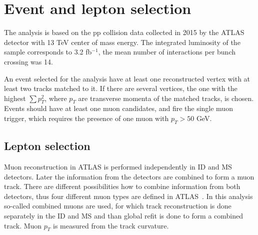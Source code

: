 \section{Event and lepton selection}
\label{sec:wprimeSelection}

The analysis is based on the pp collision data collected in 2015 by the ATLAS detector with 13 TeV center of mass energy.
The integrated luminosity of the sample corresponds to 3.2 fb$^{-1}$, the mean number of interactions per bunch crossing was 14.

An event selected for the analysis have at least one reconstructed vertex with at least two tracks matched to it. 
If there are several vertices, the one with the highest
$\sum p^2_T$, where $p_T$ are transverse momenta of the matched tracks, is chosen.
Events should have at least one muon candidates, and fire the single muon trigger, 
which requires the presence of one muon with $p_T > 50$ GeV.

\subsection{Lepton selection}
Muon reconstruction in ATLAS is performed independently in ID and MS detectors. 
Later the information from the detectors are combined to form a muon track.
There are different possibilities how to combine information from both detectors, 
thus four different muon types are defined in ATLAS~\cite{muon_performance_2015}.
In this analysis so-called combined muons are used, for which track reconstruction is done 
separately in the ID and MS and than global refit is done to form a combined track.
Muon $p_T$ is measured from the track curvature.


